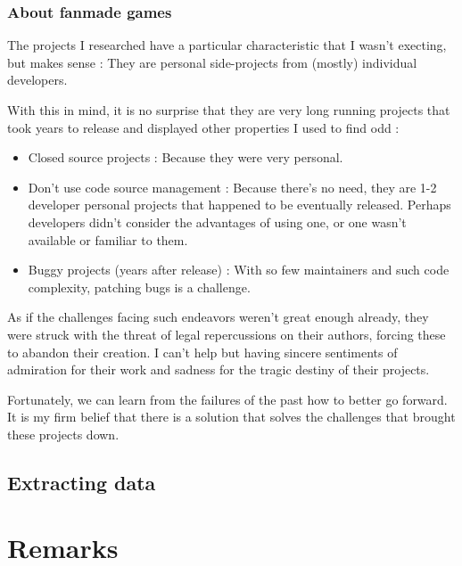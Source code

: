 \documentclass[11pt]{article}
\begin{document}
\subsubsection{About fanmade games}

The projects I researched have a particular characteristic that I wasn't execting, but makes sense : They are personal side-projects from (mostly) individual developers. 

With this in mind, it is no surprise that they are very long running projects that took years to release and displayed other properties I used to find odd :
\begin{itemize}
	\item Closed source projects : Because they were very personal.
	\item Don't use code source management : Because there's no need, they are 1-2 developer personal projects that happened to be eventually released. Perhaps developers didn't consider the advantages of using one, or one wasn't available or familiar to them.
	\item Buggy projects (years after release) : With so few maintainers and such code complexity, patching bugs is a challenge.
\end{itemize} 

As if the challenges facing such endeavors weren't great enough already, they were struck with the threat of legal repercussions on their authors, forcing these to abandon their creation. I can't help but having sincere sentiments of admiration for their work and sadness for the tragic destiny of their projects.



Fortunately, we can learn from the failures of the past how to better go forward. It is my firm belief that there is a solution that solves the challenges that brought these projects down.

\newpage
\subsection{Extracting data}













\newpage
\section{Remarks}
\end{document}
